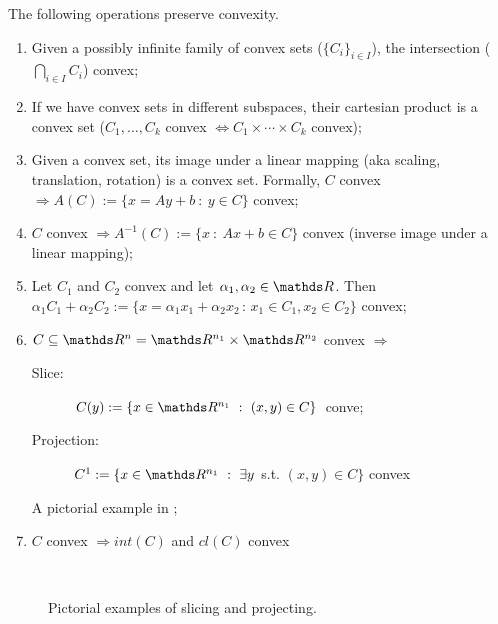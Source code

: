 \documentclass[computationalMathematics.tex]{subfiles}
\begin{document}
\begin{proposition}
The following operations preserve convexity.
\begin{enumerate}
  \item Given a possibly infinite family of convex sets (${\{C_i\}}_{i \in I}$), the intersection ($\bigcap_{i \in I} C_i$) convex;
  
  \item If we have convex sets in different subspaces, their cartesian product is a convex set ($C_1, \ldots, C_k$ convex $\iff C_1 \times \cdots \times C_k$ convex);
  
  \item Given a convex set, its image under a linear mapping (aka scaling, translation, rotation) is a convex set. Formally, $C$ convex $\Longrightarrow A(C) := \{x = Ay + b~:~y \in C\}$ convex; 
  
  \item $C$ convex $\Longrightarrow A^{-1}(C) := \{x~:~Ax + b \in C\}$ convex (inverse image under a linear mapping);
  
  \item Let $C_1$ and $C_2$ convex and let $\alpha_1, \alpha_2 \in \R$. Then $\alpha_1 C_1 + \alpha_2 C_2 := \{ x = \alpha_1 x_1 + \alpha_2 x_2 \,:\, x_1 \in C_1, x_2 \in C_2\}$ convex;
  \item $C \subseteq \R^n = \R^{n_1} \times \R^{n_2}$ convex $\Longrightarrow$
  \begin{description}
    \item[{\small \sc Slice:}] $C(y) := \{x \in \R^{n_1}~:~(x, y) \in C\}$ conve;
    \item[{\small \sc Projection:}] $C^1 := \{x \in \R^{n_1}~:~\exists y$ s.t. $(x, y) \in C\}$ convex
  \end{description}
    A pictorial example in ;
  \item $C$ convex $\Longrightarrow int(C)$ and $cl(C)$ convex
\end{enumerate}
\end{proposition}

\begin{figure}[h]
  \centering
  \hspace{0.5cm}
  \\
  \caption{Pictorial examples of slicing and projecting.}\label{fig:5ott_3}
\end{figure}
\end{document}
